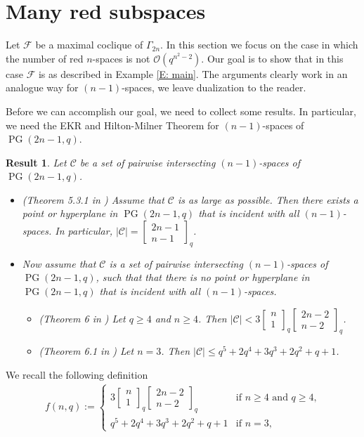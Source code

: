 \documentclass[11pt, oneside, a4paper]{article}
\newtheorem{result}[thm]{Result}
\newcommand{\EKR}{\mathcal{F}}
\newcommand{\OO}{\mathcal{O}}
\newcommand{\Gauss}[2]{{\begin{bmatrix} #1 \\ #2 \end{bmatrix}_q}}
\DeclareMathOperator{\PG}{PG}
\begin{document}
\section{Many red subspaces}

Let $\EKR$ be a maximal coclique of $\Gamma_{2n}$.
In this section we focus on the case in which the number of red $n$-spaces is not $\OO(q^{n^2-2})$. Our goal is to show that in this case $\EKR$ is as described in Example \ref{E: main}. The arguments clearly work in an analogue way for $(n-1)$-spaces, we leave dualization to the reader.

Before we can accomplish our goal, we need to collect some results. In particular, we need the EKR and Hilton-Milner Theorem for $(n-1)$-spaces of $\PG(2n-1,q)$. 

\begin{result} \label{R: EKR for n=2k}
  Let $\mathcal{C}$ be a set of pairwise intersecting $(n-1)$-spaces of $\PG(2n-1,q)$. 
  \begin{itemize}
      \item[(a)] (Theorem 5.3.1 in \cite{Newman_PhD_Thesis}) Assume that $\mathcal{C}$ is as large as possible. Then there exists a point or hyperplane in $\PG(2n-1,q)$ that is incident with all $(n-1)$-spaces. In particular, $|\mathcal{C}|=\Gauss{2n-1}{n-1}$.
      \item[(b)]Now assume that $\mathcal{C}$ is a set of pairwise intersecting $(n-1)$-spaces of $\PG(2n-1,q)$, such that that there is no point or hyperplane in $\PG(2n-1,q)$ that is incident with all $(n-1)$-spaces.
          \begin{itemize}
\item[(a)] (Theorem 6 in \cite{Ihringer_Hilton_Milner}) Let $q\geq 4$ and $n\geq 4$. Then $|\mathcal{C}|<3\Gauss{n}{1}\Gauss{2n-2}{n-2}$.
\item[(b)] (Theorem 6.1 in \cite{k=3_Hilton_Milner})
  Let $n=3$. Then $|\mathcal{C}|\leq q^5+2q^4+3q^3+2q^2+q+1$.
\end{itemize}
  \end{itemize}
\end{result}




We recall the following definition 
\begin{align*}
f(n,q):=\left\{\begin{array}{ll}
3\Gauss{n}{1}\Gauss{2n-2}{n-2} & \text{if $n\geq 4$ and $q\geq 4$,}
\\
q^5+2q^4+3q^3+2q^2+q+1 &  \text{if $n=3$,}
\end{array}
\right.
\end{align*}
\end{document}

